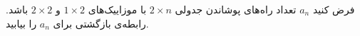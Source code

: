     \p 
فرض کنید
$a_n$
تعداد راه‌های پوشاندن جدولی
$2 \times n$
با موزاییک‌های
$1 \times 2$
و
$2 \times 2$
باشد. رابطه‌ی بازگشتی برای
$a_n$
را بیابید.